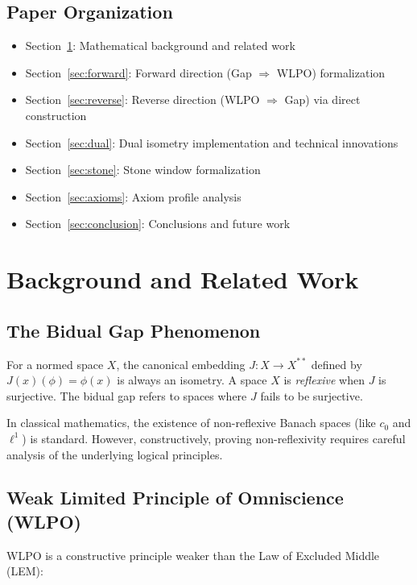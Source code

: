 \documentclass{lmcs}
\begin{document}
\subsection{Paper Organization}

\begin{itemize}
\item Section~\ref{sec:background}: Mathematical background and related work
\item Section~\ref{sec:forward}: Forward direction (Gap $\Rightarrow$ WLPO) formalization
\item Section~\ref{sec:reverse}: Reverse direction (WLPO $\Rightarrow$ Gap) via direct construction
\item Section~\ref{sec:dual}: Dual isometry implementation and technical innovations
\item Section~\ref{sec:stone}: Stone window formalization
\item Section~\ref{sec:axioms}: Axiom profile analysis
\item Section~\ref{sec:conclusion}: Conclusions and future work
\end{itemize}

\section{Background and Related Work}\label{sec:background}

\subsection{The Bidual Gap Phenomenon}

For a normed space $X$, the canonical embedding $J: X \to X^{**}$ defined by $J(x)(\phi) = \phi(x)$ is always an isometry. A space $X$ is \emph{reflexive} when $J$ is surjective. The bidual gap refers to spaces where $J$ fails to be surjective.

In classical mathematics, the existence of non-reflexive Banach spaces (like $c_0$ and $\ell^1$) is standard. However, constructively, proving non-reflexivity requires careful analysis of the underlying logical principles.

\subsection{Weak Limited Principle of Omniscience (WLPO)}

WLPO is a constructive principle weaker than the Law of Excluded Middle (LEM):
\end{document}
